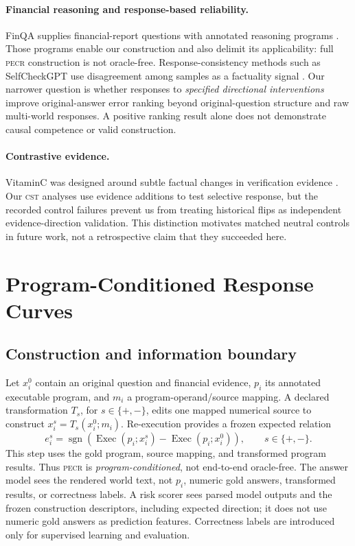 \documentclass[11pt]{article}
\newcommand{\PECR}{\textsc{pecr}}
\newcommand{\CST}{\textsc{cst}}
\newcommand{\sgn}{\operatorname{sgn}}
\newcommand{\Exec}{\operatorname{Exec}}
\begin{document}
\paragraph{Financial reasoning and response-based reliability.}
FinQA supplies financial-report questions with annotated reasoning programs \citep{chen-etal-2021-finqa}. Those programs enable our construction and also delimit its applicability: full \PECR{} construction is not oracle-free. Response-consistency methods such as SelfCheckGPT use disagreement among samples as a factuality signal \citep{manakul-etal-2023-selfcheckgpt}. Our narrower question is whether responses to \emph{specified directional interventions} improve original-answer error ranking beyond original-question structure and raw multi-world responses. A positive ranking result alone does not demonstrate causal competence or valid construction.

\paragraph{Contrastive evidence.}
VitaminC was designed around subtle factual changes in verification evidence \citep{schuster-etal-2021-get}. Our \CST{} analyses use evidence additions to test selective response, but the recorded control failures prevent us from treating historical flips as independent evidence-direction validation. This distinction motivates matched neutral controls in future work, not a retrospective claim that they succeeded here.

\section{Program-Conditioned Response Curves}
\subsection{Construction and information boundary}
Let $x_i^{0}$ contain an original question and financial evidence, $p_i$ its annotated executable program, and $m_i$ a program-operand/source mapping. A declared transformation $T_s$, for $s\in\{+,-\}$, edits one mapped numerical source to construct $x_i^s=T_s(x_i^0;m_i)$. Re-execution provides a frozen expected relation
\begin{equation}
e_i^s=\sgn\!\left(\Exec(p_i;x_i^s)-\Exec(p_i;x_i^0)\right),\qquad s\in\{+,-\}.
\label{eq:expected}
\end{equation}
This step uses the gold program, source mapping, and transformed program results. Thus \PECR{} is \emph{program-conditioned}, not end-to-end oracle-free. The answer model sees the rendered world text, not $p_i$, numeric gold answers, transformed results, or correctness labels. A risk scorer sees parsed model outputs and the frozen construction descriptors, including expected direction; it does not use numeric gold answers as prediction features. Correctness labels are introduced only for supervised learning and evaluation.
\end{document}
